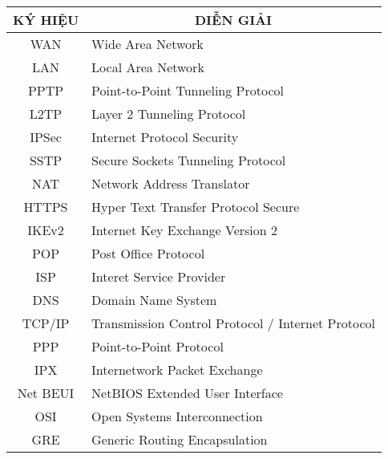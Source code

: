 \vspace{2em}
\begin{table}[ht!]
\centering
\begin{tabular}{|c|l|}
\hline
\textbf{KÝ HIỆU} & \multicolumn{1}{c|}{\textbf{DIỄN GIẢI}}                     \\ \hline
WAN  &              Wide Area Network           \\ \hline
LAN              &     Local Area Network                                  \\ \hline
PPTP               &     Point-to-Point Tunneling Protocol                                            \\ \hline
L2TP             &    Layer 2 Tunneling Protocol                                              \\ \hline
IPSec               &      Internet Protocol Security                                             \\ \hline
SSTP              &    Secure Sockets Tunneling Protocol        \\ \hline
NAT             &    Network Address Translator       \\ \hline
HTTPS             &    Hyper Text Transfer Protocol Secure       \\ \hline
IKEv2              &     Internet Key Exchange Version 2       \\ \hline
POP              & Post Office Protocol      \\ \hline
ISP              & Interet Service Provider                     \\ \hline
DNS       &     Domain Name System                      \\ \hline
TCP/IP              &    Transmission Control Protocol / Internet Protocol                    \\ \hline
PPP             & Point-to-Point Protocol                                        \\ \hline
IPX              &  Internetwork Packet Exchange                                                \\ \hline
Net BEUI              &     NetBIOS Extended User Interface                                    \\ \hline
OSI  &   Open Systems Interconnection                       \\ \hline
GRE             & Generic Routing Encapsulation                                                   \\ \hline

\end{tabular}
\end{table}
